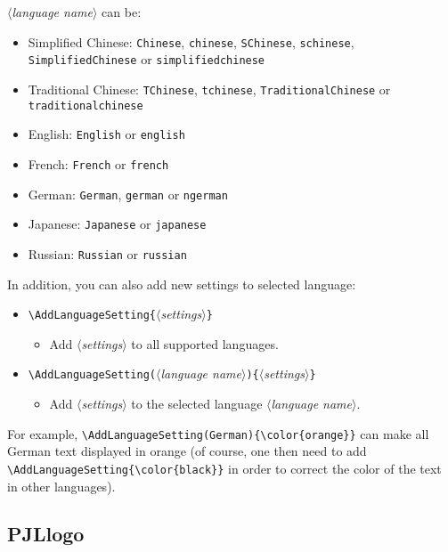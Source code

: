 \documentclass[allowbf]{lebhart}
\providecommand{\meta}[1]{$\langle${\normalfont\itshape#1}$\rangle$}
\begin{document}
\meta{language name} can be:
\begin{itemize}
    \item Simplified Chinese: \texttt{Chinese}, \texttt{chinese}, \texttt{SChinese}, \texttt{schinese}, \texttt{SimplifiedChinese} or \texttt{simplifiedchinese}
    \item Traditional Chinese: \texttt{TChinese}, \texttt{tchinese}, \texttt{TraditionalChinese} or \texttt{traditionalchinese}
    \item English: \texttt{English} or \texttt{english}
    \item French: \texttt{French} or \texttt{french}
    \item German: \texttt{German}, \texttt{german} or \texttt{ngerman}
    \item Japanese: \texttt{Japanese} or \texttt{japanese}
    \item Russian: \texttt{Russian} or \texttt{russian}
\end{itemize}

\medskip
In addition, you can also add new settings to selected language:
\begin{itemize}
    \item \lstinline|\AddLanguageSetting{|\meta{settings}\lstinline|}|
    \begin{itemize}
        \item Add \meta{settings} to all supported languages.
    \end{itemize}
    \item \lstinline|\AddLanguageSetting(|\meta{language name}\lstinline|){|\meta{settings}\lstinline|}|
    \begin{itemize}
        \item Add \meta{settings} to the selected language \meta{language name}.
    \end{itemize}
\end{itemize}
For example, \lstinline|\AddLanguageSetting(German){\color{orange}}| can make all German text displayed in orange (of course, one then need to add \lstinline|\AddLanguageSetting{\color{black}}| in order to correct the color of the text in other languages).


\subsection{PJLlogo}
\end{document}
